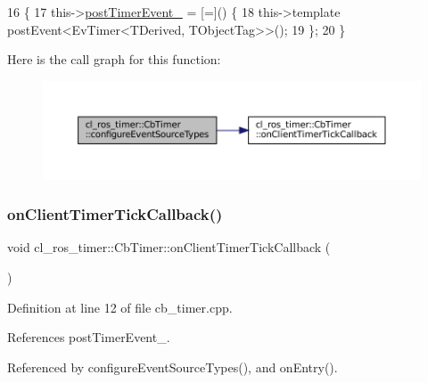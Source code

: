 \begin{DoxyCode}
16   \{
17     this->\hyperlink{classcl__ros__timer_1_1CbTimer_ad2b7913a84459d635fdcca8d346c7af2}{postTimerEvent\_} = [=]() \{
18       this->\textcolor{keyword}{template} postEvent<EvTimer<TDerived, TObjectTag>>();
19     \};
20   \}
\end{DoxyCode}
Here is the call graph for this function\+:
\nopagebreak
\begin{figure}[H]
\begin{center}
\leavevmode
\includegraphics[width=350pt]{classcl__ros__timer_1_1CbTimer_a09267b38fed9b6db637eba8b2f789d1c_cgraph}
\end{center}
\end{figure}
\mbox{\label{classcl__ros__timer_1_1CbTimer_a9895eb7e05a5922fa27f2bc46f5486a0}} 
\subsubsection{\texorpdfstring{on\+Client\+Timer\+Tick\+Callback()}{onClientTimerTickCallback()}}
{\footnotesize\ttfamily void cl\+\_\+ros\+\_\+timer\+::\+Cb\+Timer\+::on\+Client\+Timer\+Tick\+Callback (\begin{DoxyParamCaption}{ }\end{DoxyParamCaption})}



Definition at line 12 of file cb\+\_\+timer.\+cpp.



References post\+Timer\+Event\+\_\+.



Referenced by configure\+Event\+Source\+Types(), and on\+Entry().


